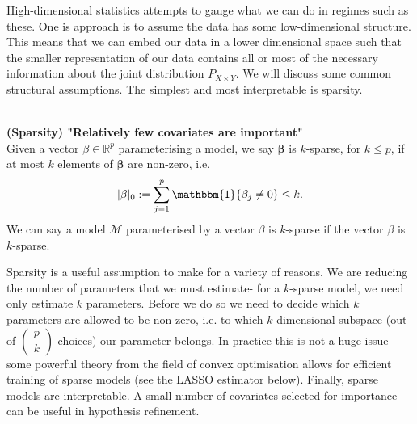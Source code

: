 \documentclass[thesis.tex]{subfiles}
\begin{document}
High-dimensional statistics attempts to gauge what we can do in regimes such as these. One is approach is to assume the data has some low-dimensional structure. This means that we can embed our data in a lower dimensional space such that the smaller representation of our data contains all or most of the necessary information about the joint distribution $P_{X\times Y}$. We will discuss some common structural assumptions. The simplest and most interpretable is sparsity. \\~\\

\begin{definition}{\textbf{(Sparsity) "Relatively few covariates are important"} \label{def:sparse}} \\
Given a vector $\beta \in \mathbb{R}^p$ parameterising a model, we say $\mathbf{\beta}$ is $k$-sparse, for $k \leq p$, if at most $k$ elements of $\mathbf{\beta}$ are non-zero, i.e.
$$|\mathbf{\beta}|_0 := \sum_{j=1}^{p}\mathbbm{1}\{\beta_j \neq 0\} \leq k. $$
We can say a model $\mathcal{M}$ parameterised by a vector $\beta$ is $k$-sparse if the vector $\beta$ is $k$-sparse.
\end{definition}

Sparsity is a useful assumption to make for a variety of reasons. We are reducing the number of parameters that we must estimate- for a $k$-sparse model, we need only estimate $k$ parameters. Before we do so we need to decide which $k$ parameters are allowed to be non-zero, i.e. to which $k$-dimensional subspace (out of $\begin{pmatrix} p \\ k \end{pmatrix}$ choices) our parameter belongs. In practice this is not a huge issue - some powerful theory from the field of convex optimisation allows for efficient training of sparse models (see the LASSO estimator below). Finally, sparse models are interpretable. A small number of covariates selected for importance can be useful in hypothesis refinement.
\end{document}
